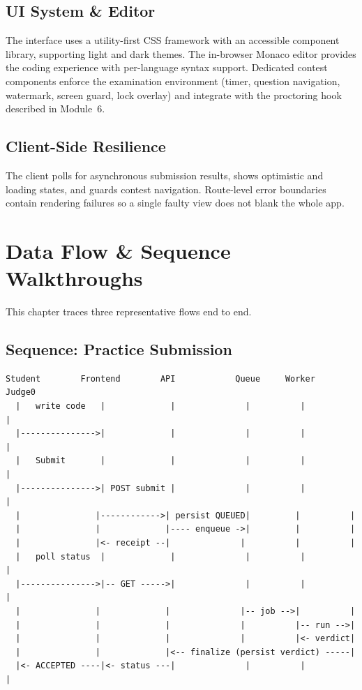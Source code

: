 \documentclass[12pt,a4paper,oneside]{report}
\begin{document}
\section{UI System \& Editor}
The interface uses a utility-first CSS framework with an accessible component
library, supporting light and dark themes. The in-browser Monaco editor provides
the coding experience with per-language syntax support. Dedicated contest
components enforce the examination environment (timer, question navigation,
watermark, screen guard, lock overlay) and integrate with the proctoring hook
described in Module~6.

\section{Client-Side Resilience}
The client polls for asynchronous submission results, shows optimistic and
loading states, and guards contest navigation. Route-level error boundaries
contain rendering failures so a single faulty view does not blank the whole app.

\chapter{Data Flow \& Sequence Walkthroughs}
This chapter traces three representative flows end to end.

\section{Sequence: Practice Submission}
\begin{lstlisting}[language={}]
Student        Frontend        API            Queue     Worker     Judge0
  |   write code   |             |              |          |          |
  |--------------->|             |              |          |          |
  |   Submit       |             |              |          |          |
  |--------------->| POST submit |              |          |          |
  |               |------------>| persist QUEUED|         |          |
  |               |             |---- enqueue ->|         |          |
  |               |<- receipt --|              |          |          |
  |   poll status  |             |              |          |          |
  |--------------->|-- GET ----->|              |          |          |
  |               |             |              |-- job -->|          |
  |               |             |              |          |-- run -->|
  |               |             |              |          |<- verdict|
  |               |             |<-- finalize (persist verdict) -----|
  |<- ACCEPTED ----|<- status ---|              |          |          |
\end{lstlisting}
\end{document}
